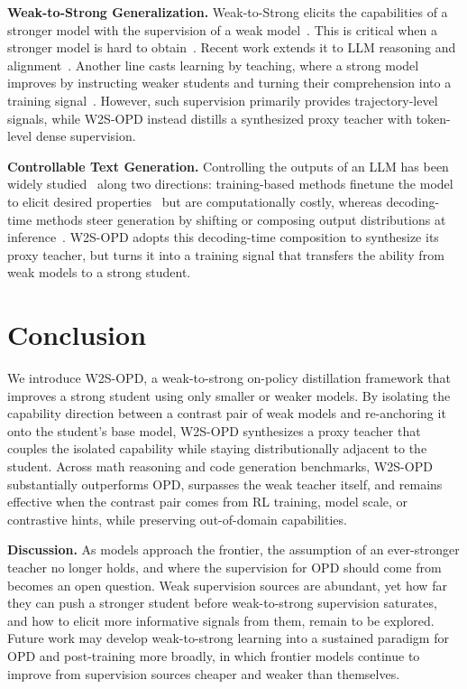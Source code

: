 \documentclass{article}
\newcommand\ours{W2S-OPD\xspace}
\begin{document}
\textbf{Weak-to-Strong Generalization.}
Weak-to-Strong elicits the capabilities of a stronger model with the supervision of a weak model~\citep{burns2023weak}. This is critical when a stronger model is hard to obtain~\citep{christiano2018supervising}. Recent work extends it to LLM reasoning and alignment~\citep{yao2025revisiting, yao2025weak, yuan2026incentivizing, yang2024weak, zhao2024weak}. Another line casts learning by teaching, where a strong model improves by instructing weaker students and turning their comprehension into a training signal~\citep{ning2024can, cetin2026reinforcement}.
However, such supervision primarily provides trajectory-level signals, while \ours instead distills a synthesized proxy teacher with token-level dense supervision.

\textbf{Controllable Text Generation.} Controlling the outputs of an LLM has been widely studied~\citep{prabhumoye2020exploring} along two directions: training-based methods finetune the model to elicit desired properties~\citep{keskar2019ctrl, chan2020cocon} but are computationally costly, whereas decoding-time methods steer generation by shifting or composing output distributions at inference~\citep{liu2021dexperts, krause2021gedi, qin2022cold}. \ours adopts this decoding-time composition to synthesize its proxy teacher, but turns it into a training signal that transfers the ability from weak models to a strong student.

\section{Conclusion}
We introduce \ours, a weak-to-strong on-policy distillation framework that improves a strong student using only smaller or weaker models. By isolating the capability direction between a contrast pair of weak models and re-anchoring it onto the student's base model, \ours synthesizes a proxy teacher that couples the isolated capability while staying distributionally adjacent to the student. Across math reasoning and code generation benchmarks, \ours substantially outperforms OPD, surpasses the weak teacher itself, and remains effective when the contrast pair comes from RL training, model scale, or contrastive hints, while preserving out-of-domain capabilities.

\textbf{Discussion.} As models approach the frontier, the assumption of an ever-stronger teacher no longer holds, and where the supervision for OPD should come from becomes an open question. Weak supervision sources are abundant, yet how far they can push a stronger student before weak-to-strong supervision saturates, and how to elicit more informative signals from them, remain to be explored. Future work may develop weak-to-strong learning into a sustained paradigm for OPD and post-training more broadly, in which frontier models continue to improve from supervision sources cheaper and weaker than themselves.
\end{document}
